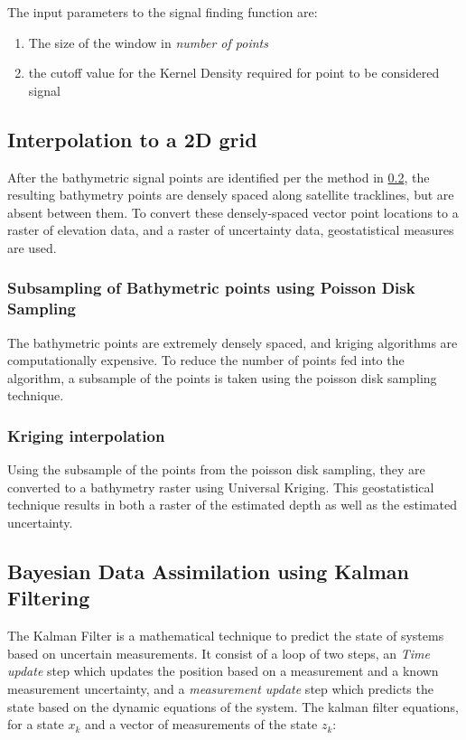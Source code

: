 The input parameters to the signal finding function are:

\begin{enumerate}
    \item The size of the window in \emph{number of points}
    \item the cutoff value for the Kernel Density required for point to be considered signal
\end{enumerate}

\subsection{Interpolation to a 2D grid}
After the bathymetric signal points are identified per the method in \ref{}, the resulting bathymetry points are densely spaced along satellite tracklines, but are absent between them. To convert these densely-spaced vector point locations to a raster of elevation data, and a raster of uncertainty data, geostatistical measures are used.

\subsubsection{Subsampling of Bathymetric points using Poisson Disk Sampling} \label{subsec:poissonsubsampling}
The bathymetric points are extremely densely spaced, and kriging algorithms are computationally expensive. To reduce the number of points fed into the algorithm, a subsample of the points is taken using the poisson disk sampling technique. 

\subsubsection{Kriging interpolation}
Using the subsample of the points from the poisson disk sampling, they are converted to a bathymetry raster using Universal Kriging. This geostatistical technique results in both a raster of the estimated depth as well as the estimated uncertainty. 


\subsection{Bayesian Data Assimilation using Kalman Filtering}
The Kalman Filter is a mathematical technique to predict the state of systems based on uncertain measurements. It consist of a loop of two steps, an \emph{Time update} step which updates the position based on a measurement and a known measurement uncertainty, and a \emph{measurement update} step which predicts the state based on the dynamic equations of the system. The kalman filter equations, for a state $x_k$ and a vector of measurements of the state $z_k$:

